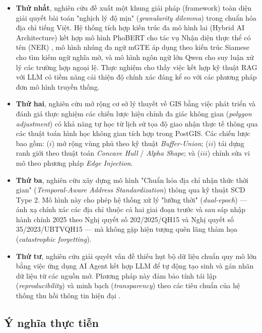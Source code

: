 \begin{itemize}
\item \textbf{Thứ nhất}, nghiên cứu đề xuất một khung giải pháp (framework) toàn diện giải quyết bài toán "nghịch lý độ mịn" (\textit{granularity dilemma}) trong chuẩn hóa địa chỉ tiếng Việt. Hệ thống tích hợp kiến trúc đa mô hình lai (Hybrid AI Architecture) kết hợp mô hình PhoBERT cho tác vụ Nhận diện thực thể có tên (NER) \cite{nguyen2020phobert}, mô hình nhúng đa ngữ mGTE \cite{mgte2024} áp dụng theo kiến trúc Siamese \cite{cao2021deep} cho tìm kiếm ngữ nghĩa mờ, và mô hình ngôn ngữ lớn Qwen cho suy luận xử lý các trường hợp ngoại lệ. Thực nghiệm cho thấy việc kết hợp kỹ thuật RAG với LLM có tiềm năng cải thiện độ chính xác đáng kể so với các phương pháp đơn mô hình truyền thống.

\item \textbf{Thứ hai}, nghiên cứu mở rộng cơ sở lý thuyết về GIS bằng việc phát triển và đánh giá thực nghiệm các chiến lược hiệu chỉnh đa giác không gian (\textit{polygon adjustment}) có khả năng tự học từ lịch sử tọa độ giao nhận thực tế thông qua các thuật toán hình học không gian tích hợp trong PostGIS. Các chiến lược bao gồm: ($i$) mở rộng vùng phủ theo kỹ thuật \textit{Buffer-Union}; ($ii$) tái dựng ranh giới theo thuật toán \textit{Concave Hull} / \textit{Alpha Shape}; và ($iii$) chỉnh sửa vi mô theo phương pháp \textit{Edge Injection}. 

\item \textbf{Thứ ba}, nghiên cứu xây dựng mô hình "Chuẩn hóa địa chỉ nhận thức thời gian" (\textit{Temporal-Aware Address Standardization}) thông qua kỹ thuật SCD Type 2. Mô hình này cho phép hệ thống xử lý "lưỡng thời" (\textit{dual-epoch}) — ánh xạ chính xác các địa chỉ thuộc cả hai giai đoạn trước và sau sáp nhập hành chính 2025 theo Nghị quyết số 202/2025/QH15 và Nghị quyết số 35/2023/UBTVQH15 \cite{ubtvqh2023} — mà không gặp hiện tượng quên lãng thảm họa (\textit{catastrophic forgetting}).

\item \textbf{Thứ tư}, nghiên cứu giải quyết vấn đề thiếu hụt bộ dữ liệu chuẩn quy mô lớn bằng việc ứng dụng AI Agent kết hợp LLM để tự động tạo sinh và gán nhãn dữ liệu từ các nguồn mở. Phương pháp này đảm bảo tính tái lập (\textit{reproducibility}) và minh bạch (\textit{transparency}) theo các tiêu chuẩn của hệ thống thu hồi thông tin hiện đại \cite{manning2008IR}.


\end{itemize}

\subsection{Ý nghĩa thực tiễn}

